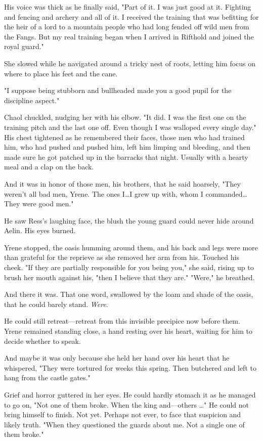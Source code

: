 His voice was thick as he finally said, "Part of it.
I was just  good at it.
Fighting and fencing and archery and all of it.
I received the training that was befitting for the heir of a lord to a mountain people who had long fended off wild men from the Fangs.
But my real training began when I arrived in Rifthold and joined the royal guard."

She slowed while he navigated around a tricky nest of roots, letting him focus on where to place his feet and the cane.

"I suppose being stubborn and bullheaded made you a good pupil for the discipline aspect."

Chaol chuckled, nudging her with his elbow.
"It did.
I was the first one on the training pitch and the last one off.
Even though I was walloped every single day."
His chest tightened as he remembered their faces, those men who had trained him, who had pushed and pushed him, left him limping and bleeding, and then made sure he got patched up in the barracks that night.
Usually with a hearty meal and a clap on the back.

And it was in honor of those men, his brothers, that he said hoarsely, "They weren't all bad men, Yrene.
The ones I\ldots I grew up with, whom I commanded\ldots They were good men."

He saw Ress's laughing face, the blush the young guard could never hide around Aelin.
His eyes burned.

Yrene stopped, the oasis humming around them, and his back and legs were more than grateful for the reprieve as she removed her arm from his.
Touched his cheek.
"If they are partially responsible for you being  you," she said, rising up to brush her mouth against his, "then I believe that they are."
"Were," he breathed.

And there it was.
That one word, swallowed by the loam and shade of the oasis, that he could barely stand.
\emph{Were}.

He could still retreat---retreat from this invisible precipice now before them.
Yrene remained standing close, a hand resting over his heart, waiting for him to decide whether to speak.

And maybe it was only because she held her hand over his heart that he whispered, "They were tortured for weeks this spring.
Then butchered and left to hang from the castle gates."

Grief and horror guttered in her eyes.
He could hardly stomach it as he managed to go on, "Not one of them broke.
When the king and---others \ldots" He could not bring himself to finish.
Not yet.
Perhaps not ever, to face that suspicion and likely truth.
"When they questioned the guards about me.
Not a single one of them broke."

